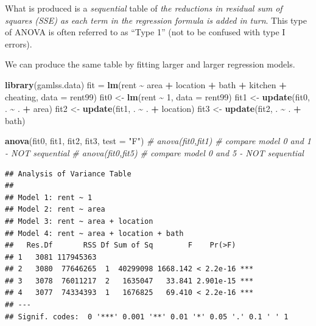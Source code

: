 \documentclass[
  ignorenonframetext,
]{beamer}
\newenvironment{Shaded}{\begin{snugshade}}{\end{snugshade}}
\newcommand{\AttributeTok}[1]{\textcolor[rgb]{0.13,0.29,0.53}{#1}}
\newcommand{\CommentTok}[1]{\textcolor[rgb]{0.56,0.35,0.01}{\textit{#1}}}
\newcommand{\DecValTok}[1]{\textcolor[rgb]{0.00,0.00,0.81}{#1}}
\newcommand{\FunctionTok}[1]{\textcolor[rgb]{0.13,0.29,0.53}{\textbf{#1}}}
\newcommand{\NormalTok}[1]{#1}
\newcommand{\OtherTok}[1]{\textcolor[rgb]{0.56,0.35,0.01}{#1}}
\newcommand{\SpecialCharTok}[1]{\textcolor[rgb]{0.81,0.36,0.00}{\textbf{#1}}}
\newcommand{\StringTok}[1]{\textcolor[rgb]{0.31,0.60,0.02}{#1}}
\begin{document}
\begin{frame}[fragile]
What is produced is a \emph{sequential} table of \emph{the reductions in
residual sum of squares (SSE) as each term in the regression formula is
added in turn}. This type of ANOVA is often referred to as ``Type 1''
(not to be confused with type I errors).

We can produce the same table by fitting larger and larger regression
models.

\begin{Shaded}
\begin{Highlighting}[]
\FunctionTok{library}\NormalTok{(gamlss.data)}
\NormalTok{fit }\OtherTok{=} \FunctionTok{lm}\NormalTok{(rent }\SpecialCharTok{\textasciitilde{}}\NormalTok{ area }\SpecialCharTok{+}\NormalTok{ location }\SpecialCharTok{+}\NormalTok{ bath }\SpecialCharTok{+}\NormalTok{ kitchen }\SpecialCharTok{+}\NormalTok{ cheating, }\AttributeTok{data =}\NormalTok{ rent99)}
\NormalTok{fit0 }\OtherTok{\textless{}{-}} \FunctionTok{lm}\NormalTok{(rent }\SpecialCharTok{\textasciitilde{}} \DecValTok{1}\NormalTok{, }\AttributeTok{data =}\NormalTok{ rent99)}
\NormalTok{fit1 }\OtherTok{\textless{}{-}} \FunctionTok{update}\NormalTok{(fit0, . }\SpecialCharTok{\textasciitilde{}}\NormalTok{ . }\SpecialCharTok{+}\NormalTok{ area)}
\NormalTok{fit2 }\OtherTok{\textless{}{-}} \FunctionTok{update}\NormalTok{(fit1, . }\SpecialCharTok{\textasciitilde{}}\NormalTok{ . }\SpecialCharTok{+}\NormalTok{ location)}
\NormalTok{fit3 }\OtherTok{\textless{}{-}} \FunctionTok{update}\NormalTok{(fit2, . }\SpecialCharTok{\textasciitilde{}}\NormalTok{ . }\SpecialCharTok{+}\NormalTok{ bath)}
\end{Highlighting}
\end{Shaded}
\end{frame}

\begin{frame}[fragile]
\begin{Shaded}
\begin{Highlighting}[]
\FunctionTok{anova}\NormalTok{(fit0, fit1, fit2, fit3, }\AttributeTok{test =} \StringTok{"F"}\NormalTok{)}
\CommentTok{\# anova(fit0,fit1) \# compare model 0 and 1 {-} NOT sequential}
\CommentTok{\# anova(fit0,fit5) \# compare model 0 and 5 {-} NOT sequential}
\end{Highlighting}
\end{Shaded}

\begin{verbatim}
## Analysis of Variance Table
## 
## Model 1: rent ~ 1
## Model 2: rent ~ area
## Model 3: rent ~ area + location
## Model 4: rent ~ area + location + bath
##   Res.Df       RSS Df Sum of Sq        F    Pr(>F)    
## 1   3081 117945363                                    
## 2   3080  77646265  1  40299098 1668.142 < 2.2e-16 ***
## 3   3078  76011217  2   1635047   33.841 2.901e-15 ***
## 4   3077  74334393  1   1676825   69.410 < 2.2e-16 ***
## ---
## Signif. codes:  0 '***' 0.001 '**' 0.01 '*' 0.05 '.' 0.1 ' ' 1
\end{verbatim}
\end{frame}
\end{document}
